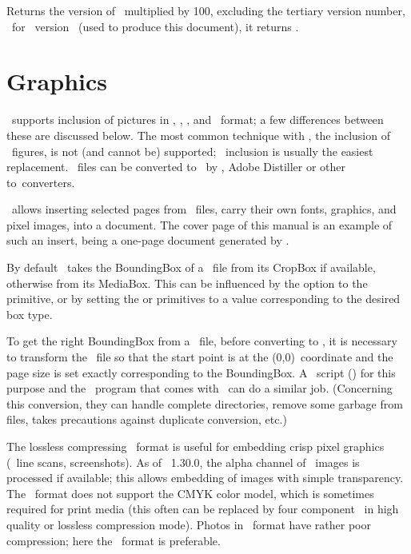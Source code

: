 \documentclass{pdftexmanual}
\begin{document}
Returns the version of \PDFTEX\ multiplied by 100, excluding the tertiary
version number, \eg\ for \PDFTEX\ version \currentpdftex\ (used to
produce this document), it returns {\tt \number\pdftexversion}.

\chapter{Graphics}

\PDFTEX\ supports inclusion of pictures in \PNG, \JPEG, \JBIGTWO, and
\PDF\ format; a few differences between these are discussed below. The
most common technique with \TEX, the inclusion of \EPS\ figures, is not
(and cannot be) supported; \PDF\ inclusion is usually the easiest
replacement. \EPS\ files can be converted to \PDF\ by \GHOSTSCRIPT,
Adobe Distiller or other \POSTSCRIPT\hyph to\hyph \PDF\ converters.

\PDFTEX\ allows inserting selected pages from \PDF\ files, carry their
own fonts, graphics, and pixel images, into a document. The cover page
of this manual is an example of such an insert, being a one-page
document generated by \PDFTEX.

By default \PDFTEX\ takes the BoundingBox of a \PDF\ file from its
CropBox if available, otherwise from its MediaBox. This can be
influenced by the  option to the 
primitive, or by setting the  or 
primitives to a value corresponding to the desired box type.

To get the right BoundingBox from a \EPS\ file, before converting to
\PDF, it is necessary to transform the \EPS\ file so that the start
point is at the (0,0)~coordinate and the page size is set exactly
corresponding to the BoundingBox. A \PERL\ script (\EPSTOPDF) for this
purpose and the \PSTOPDF\ program that comes with \GHOSTSCRIPT\ can do a
similar job. (Concerning this conversion, they can handle complete
directories, remove some garbage from files, takes precautions against
duplicate conversion, etc.)

The lossless compressing \PNG\ format is useful for embedding crisp
pixel graphics (\eg\ line scans, screenshots). As of \PDFTEX\ 1.30.0,
the alpha channel of \PNG\ images is processed if available; this allows
embedding of images with simple transparency. The \PNG\ format does not
support the CMYK color model, which is sometimes required for print
media (this often can be replaced by four component \JPEG\ in high
quality or lossless compression mode). Photos in \PNG\ format have
rather poor compression; here the \JPEG\ format is preferable.
\end{document}
